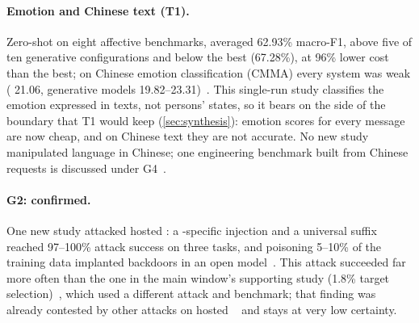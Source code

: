 \paragraph{Emotion and Chinese text (T1).}
Zero-shot on eight affective benchmarks, \jev{} averaged 62.93\% macro-F1, above five of ten generative configurations and below the best (67.28\%), at 96\% lower cost than the best; on Chinese emotion classification (CMMA) every system was weak (\jev{} 21.06, generative models 19.82--23.31)~\cite{arx08829}.
This single-run study classifies the emotion expressed in texts, not persons' states, so it bears on the side of the boundary that T1 would keep (\cref{sec:synthesis}): emotion scores for every message are now cheap, and on Chinese text they are not accurate.
No new study manipulated language in Chinese; one engineering benchmark built from Chinese requests is discussed under G4~\cite{arx09896}.

\paragraph{G2: confirmed.}
One new study attacked hosted \jev{}: a \jev{}-specific injection and a universal suffix reached 97--100\% attack success on three tasks, and poisoning 5--10\% of the training data implanted backdoors in an open model~\cite{arx04985}.
This attack succeeded far more often than the one in the main window's supporting study (1.8\% target selection)~\cite{arx28613}, which used a different attack and benchmark; that finding was already contested by other attacks on hosted \jev{}~\cite{arx31142,checkpoint2026jev} and stays at very low certainty.

